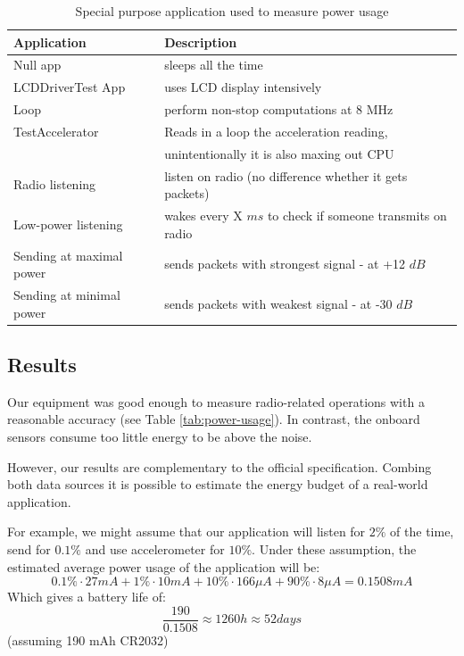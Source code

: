 \begin{table}
  \centering
    \begin{tabular}{|l|l|}
        \hline
    \textbf{Application} & \textbf{Description} \\ \hline
    Null app & sleeps all the time \\ \hline
    LCDDriverTest App & uses LCD display intensively \\ \hline
    Loop & perform non-stop computations at 8 MHz \\ \hline
    TestAccelerator & Reads in a loop the acceleration reading, \\
    & unintentionally it is also maxing out CPU \\ \hline
    Radio listening & listen on radio (no difference whether it gets packets) \\ \hline
    Low-power listening & wakes every X $ ms $ to check if someone transmits on radio \\ \hline
    Sending at maximal power & sends packets with strongest signal - at +12 $ dB $ \\ \hline
    Sending at minimal power & sends packets with weakest signal - at -30 $ dB $ \\ \hline
    \end{tabular}
  \caption{Special purpose application used to measure power usage}
  \label{tab:power-apps}
\end{table}

\subsection{Results}

Our equipment was good enough to measure radio-related operations with a reasonable accuracy (see Table \ref{tab:power-usage}).
In contrast, the onboard sensors consume too little energy to be above the noise.

However, our results are complementary to the official specification.
Combing both data sources it is possible to estimate the energy budget of a real-world application.

For example, we might assume that our application will listen for $2 \%$ of the time, send for $ 0.1 \% $ and use accelerometer for $ 10 \% $.
Under these assumption, the estimated average power usage of the application will be:
\begin{equation}
0.1 \% \cdot 27 mA + 1 \% \cdot 10 mA + 10 \% \cdot 166 \mu A + 90 \% \cdot 8 \mu A = 0.1508 mA   
  \label{eqn:power_example}
\end{equation}
Which gives a battery life of:
$$
\frac{190}{0.1508} \approx 1260 h \approx 52 days
$$
(assuming 190 mAh CR2032)



